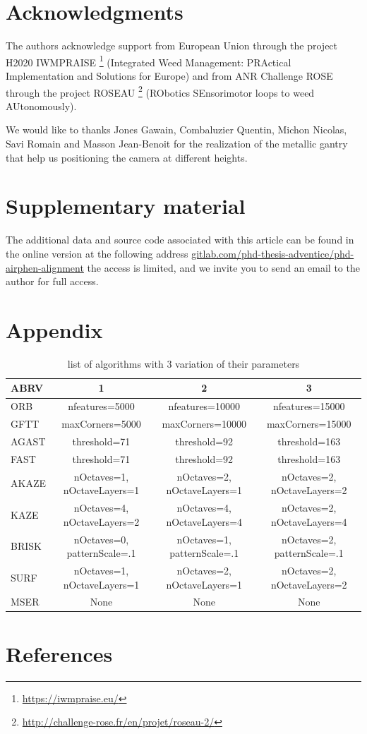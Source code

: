 \documentclass[]{elsarticle}
\begin{document}
	\section{Acknowledgments}
	
	\par The authors acknowledge support from European Union through the project H2020 IWMPRAISE \footnote{\url{https://iwmpraise.eu/}}
	(Integrated Weed Management: PRActical Implementation and Solutions for Europe)
	and from ANR Challenge ROSE through the project ROSEAU \footnote{\url{http://challenge-rose.fr/en/projet/roseau-2/}} (RObotics SEnsorimotor loops to weed AUtonomously).
	\\
	\par We would like to thanks Jones Gawain, Combaluzier Quentin, Michon Nicolas, Savi Romain and Masson Jean-Benoit
	for the realization of the metallic gantry that help us positioning the camera at different heights.
	
	\section{Supplementary material}
	
	The additional data and source code associated with this article can be found in the online version at the following address
	\url{gitlab.com/phd-thesis-adventice/phd-airphen-alignment} the access is limited,
	and we invite you to send an email to the author for full access.
	
	\section{Appendix}

	\begin{table}[H]
	\begin{tabular}{|l|c|c|c| } 
		\hline
		ABRV & 1 & 2 & 3 \\
		\hline
		ORB & nfeatures=5000 & nfeatures=10000 & nfeatures=15000 \\
		GFTT & maxCorners=5000 & maxCorners=10000 & maxCorners=15000 \\
		AGAST & threshold=71 & threshold=92 & threshold=163 \\
		FAST & threshold=71 & threshold=92 & threshold=163 \\
		AKAZE & nOctaves=1, nOctaveLayers=1 & nOctaves=2, nOctaveLayers=1 & nOctaves=2, nOctaveLayers=2 \\
		KAZE & nOctaves=4, nOctaveLayers=2 & nOctaves=4, nOctaveLayers=4 & nOctaves=2, nOctaveLayers=4 \\
		BRISK & nOctaves=0, patternScale=.1 & nOctaves=1, patternScale=.1 & nOctaves=2, patternScale=.1  \\
		SURF & nOctaves=1, nOctaveLayers=1 & nOctaves=2, nOctaveLayers=1 & nOctaves=2, nOctaveLayers=2 \\
		MSER & None & None & None \\
		\hline
	\end{tabular}
	\caption{list of algorithms with 3 variation of their parameters}
	\label{tab:used-algorithms}
	\end{table}
	
	\section{References}
	
	
	
\end{document}
